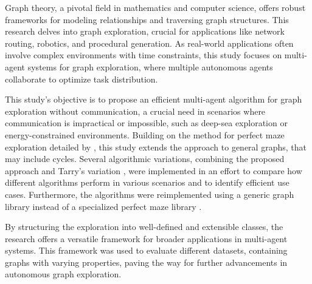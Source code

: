 Graph theory, a pivotal field in mathematics and computer science, offers robust frameworks for modeling relationships and traversing graph structures.
This research delves into graph exploration,
crucial for applications like network routing, robotics, and procedural generation.
As real-world applications often involve complex environments with time constraints,
this study focuses on multi-agent systems for graph exploration,
where multiple autonomous agents collaborate to optimize task distribution.

This study's objective is to propose an efficient multi-agent algorithm for graph exploration without communication,
a crucial need in scenarios where communication is impractical or impossible,
such as deep-sea exploration or energy-constrained environments.
Building on the method for perfect maze exploration detailed by ,
this study extends the approach to general graphs, that may include cycles.
Several algorithmic variations, combining the proposed approach and Tarry's variation \cite{Kivelevitch2010}, were implemented in an effort to compare how different algorithms perform in various scenarios and to identify efficient use cases. Furthermore, the algorithms were reimplemented using a generic graph library instead of a specialized perfect maze library \cite{Naeem2021}.

By structuring the exploration into well-defined and extensible classes,
the research offers a versatile framework for broader applications in multi-agent systems. This framework was used to evaluate different datasets, containing graphs with varying properties, paving the way for further advancements in autonomous graph exploration.

